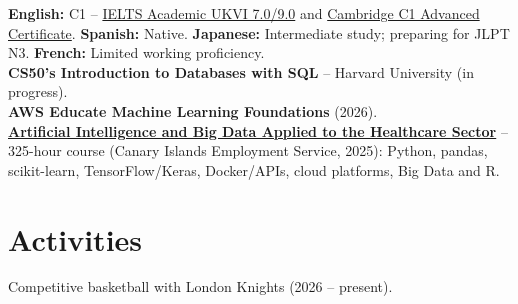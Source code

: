 \documentclass[10pt,a4paper]{article}
\begin{document}
\textbf{English:} C1 -- \href{https://albertoreyescastro.github.io/assets/certifications/IELTS_Academic_Test_Report_Form_Alberto_Reyes_Castro_Public.pdf}{IELTS Academic UKVI 7.0/9.0} and \href{https://albertoreyescastro.github.io/assets/certifications/Cambridge_C1_Advanced_English_Certificate_Alberto_Reyes_Castro_Public.pdf}{Cambridge C1 Advanced Certificate}. \textbf{Spanish:} Native. \textbf{Japanese:} Intermediate study; preparing for JLPT N3. \textbf{French:} Limited working proficiency.\\
\textbf{CS50's Introduction to Databases with SQL} -- Harvard University (in progress).\\
\textbf{AWS Educate Machine Learning Foundations} (2026).\\
\href{https://albertoreyescastro.github.io/assets/certifications/Government_of_Canary_Islands_AI_Big_Data_Healthcare_Certificate.pdf}{\textbf{Artificial Intelligence and Big Data Applied to the Healthcare Sector}} -- 325-hour course (Canary Islands Employment Service, 2025): Python, pandas, scikit-learn, TensorFlow/Keras, Docker/APIs, cloud platforms, Big Data and R.

\section{Activities}

Competitive basketball with London Knights (2026 -- present).
\end{document}
